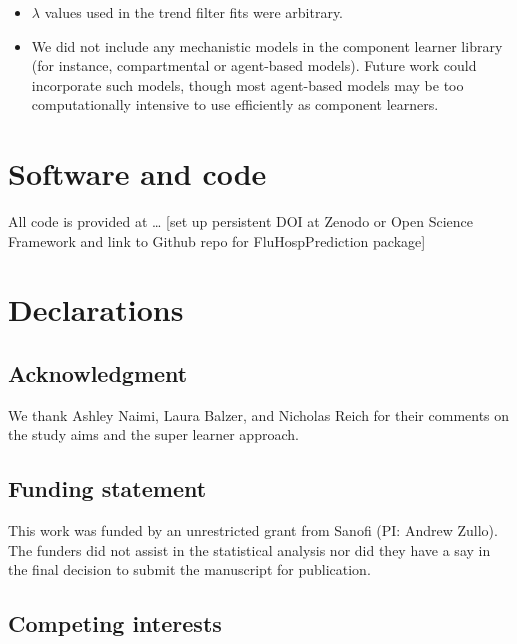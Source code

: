 \documentclass[10pt,letterpaper]{article}
\begin{document}
\begin{itemize}
\item
  \(\lambda\) values used in the trend filter fits were arbitrary.
\item
  We did not include any mechanistic models in the component learner
  library (for instance, compartmental or agent-based models). Future
  work could incorporate such models, though most agent-based models may
  be too computationally intensive to use efficiently as component
  learners.
\end{itemize}

\hypertarget{software-and-code}{%
\section{Software and code}\label{software-and-code}}

All code is provided at \ldots{} {[}set up persistent DOI at Zenodo or
Open Science Framework and link to Github repo for FluHospPrediction
package{]}

\hypertarget{declarations}{%
\section{Declarations}\label{declarations}}

\hypertarget{acknowledgment}{%
\subsection{Acknowledgment}\label{acknowledgment}}

We thank Ashley Naimi, Laura Balzer, and Nicholas Reich for their
comments on the study aims and the super learner approach.

\hypertarget{funding-statement}{%
\subsection{Funding statement}\label{funding-statement}}

This work was funded by an unrestricted grant from Sanofi (PI: Andrew
Zullo). The funders did not assist in the statistical analysis nor did
they have a say in the final decision to submit the manuscript for
publication.

\hypertarget{competing-interests}{%
\subsection{Competing interests}\label{competing-interests}}
\end{document}
